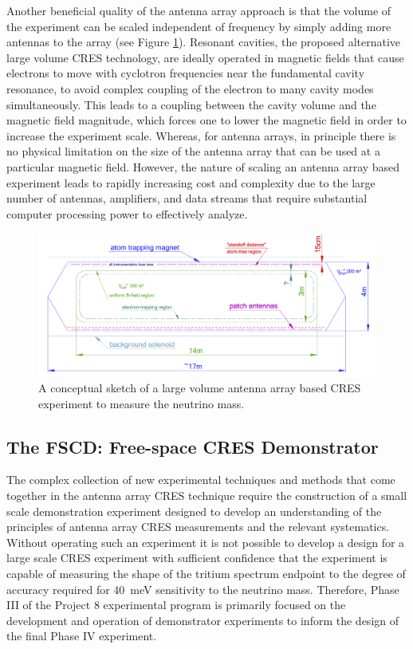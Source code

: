 Another beneficial quality of the antenna array approach is that the volume of the experiment can be scaled independent of frequency by simply adding more antennas to the array (see Figure \ref{fig:chap3-phaseiv-antenna}). Resonant cavities, the proposed alternative large volume CRES technology, are ideally operated in magnetic fields that cause electrons to move with cyclotron frequencies near the fundamental cavity resonance, to avoid complex coupling of the electron to many cavity modes simultaneously. This leads to a coupling between the cavity volume and the magnetic field magnitude, which forces one to lower the magnetic field in order to increase the experiment scale. Whereas, for antenna arrays, in principle there is no physical limitation on the size of the antenna array that can be used at a particular magnetic field. However, the nature of scaling an antenna array based experiment leads to rapidly increasing cost and complexity due to the large number of antennas, amplifiers, and data streams that require substantial computer processing power to effectively analyze.

\begin{figure}[htbp]
    \centering
    \includegraphics*[width=1\textwidth]{figs/Chapter-3/phaseiv_concept_sketch_ver2.png}
    \caption{\label{fig:chap3-phaseiv-antenna} A conceptual sketch of a large volume antenna array based CRES experiment to measure the neutrino mass.}
\end{figure}

\subsection{The FSCD: Free-space CRES Demonstrator}

The complex collection of new experimental techniques and methods that come together in the antenna array CRES technique require the construction of a small scale demonstration experiment designed to develop an understanding of the principles of antenna array CRES measurements and the relevant systematics. Without operating such an experiment it is not possible to develop a design for a large scale CRES experiment with sufficient confidence that the experiment is capable of measuring the shape of the tritium spectrum endpoint to the degree of accuracy required for 40~meV sensitivity to the neutrino mass. Therefore, Phase III of the Project 8 experimental program is primarily focused on the development and operation of demonstrator experiments to inform the design of the final Phase IV experiment.


